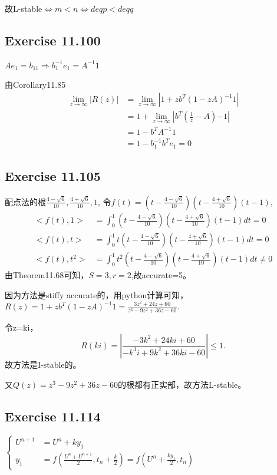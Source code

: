 \documentclass[UTF8]{ctexart}
\begin{document}
故L-stable$\Leftrightarrow m<n \Leftrightarrow deqp < deqq$

\subsection*{Exercise 11.100}
$Ae_1=b_11 \Rightarrow b_1^{-1}e_1=A^{-1}1$

由Corollary11.85
\begin{equation}
\begin{aligned}
    \lim_{z \to \infty} |R(z)| &= \lim_{z \to \infty} |1 + zb^T(1-zA)^{-1}1| \\
                               &= 1 + \lim_{z \to \infty} |b^T(\frac{1}{z}-A){-1}| \\
                               &= 1 - b^TA^{-1} 1 \\
                               &= 1 - b_1^{-1}b^Te_1 = 0
\end{aligned}
\end{equation}

\subsection*{Exercise 11.105}
配点法的根$\frac{4-\sqrt{6}}{10}, \frac{4+\sqrt{6}}{10}, 1$,
令$f(t) = (t - \frac{4-\sqrt{6}}{10})(t - \frac{4+\sqrt{6}}{10})(t - 1)$, 
\begin{equation}
\begin{aligned}
    <f(t),1> &= \int_{0}^{1}(t - \frac{4-\sqrt{6}}{10})(t - \frac{4+\sqrt{6}}{10})(t - 1)dt = 0 \\
    <f(t),t> &= \int_{0}^{1}t(t - \frac{4-\sqrt{6}}{10})(t - \frac{4+\sqrt{6}}{10})(t - 1)dt = 0 \\
    <f(t),t^2> &= \int_{0}^{1}t^2(t - \frac{4-\sqrt{6}}{10})(t - \frac{4+\sqrt{6}}{10})(t - 1)dt \neq 0
\end{aligned}
\end{equation}
由Theorem11.68可知，$S=3, r=2$,故accurate=5。

因为方法是stiffy accurate的，用python计算可知，$R(z) = 1 + zb^T(1-zA)^{-1}1 = \frac{3z^2+24z+60}{z^3-9z^2+36z-60}$.

令z=ki，
\begin{equation}
    R(ki) = |\frac{-3k^2+24ki+60}{-k^3i+9k^2+36ki-60}| \leq 1.
\end{equation}
故方法是I-stable的。

又$Q(z)=z^3-9z^2+36z-60$的根都有正实部，故方法L-stable。

\subsection*{Exercise 11.114}
$\left\{
    \begin{aligned}
        U^{n+1} &= U^n + ky_1 \\
        y_1 &= f(\frac{U^n + U^{n+1}}{2}, t_n + \frac{k}{2}) = f(U^n + \frac{ky_1}{2}, t_n)
    \end{aligned}
\right.$
\end{document}
